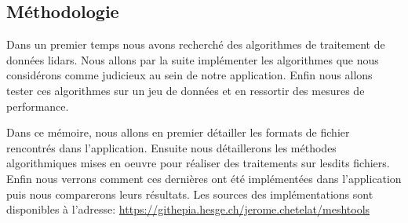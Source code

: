 \subsection{Méthodologie}
Dans un premier temps nous avons recherché des algorithmes de
traitement de données lidars.
Nous allons par la suite implémenter les algorithmes que nous considérons comme judicieux au sein de notre application.
Enfin nous allons tester ces algorithmes sur un jeu de données et en ressortir des mesures
de performance.

Dans ce mémoire, nous allons en premier détailler les formats de fichier 
rencontrés dans l'application.
Ensuite nous détaillerons les méthodes algorithmiques mises en oeuvre pour
réaliser des traitements sur lesdits fichiers.
Enfin nous verrons comment ces dernières ont été implémentées dans
l'application puis nous comparerons leurs résultats.
Les sources des implémentations sont disponibles à l'adresse: \href{https://githepia.esge.ch/jerome.chetelat/meshtools}{https://githepia.hesge.ch/jerome.chetelat/meshtools}
